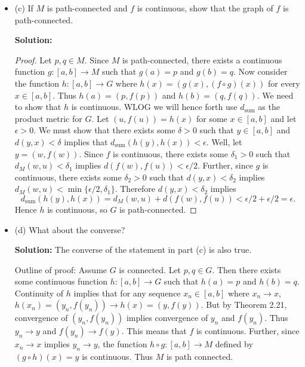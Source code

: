 \documentclass[11pt]{article}
\begin{document}
\begin{itemize}[label={},leftmargin=4mm, itemsep=1em, parsep=1em]
  \item (c) If $M$ is path-connected and $f$ is continuous, show that the graph
    of $f$ is path-connected.

  {\bf Solution:}
  \begin{proof}
    Let $p,q \in M$. Since $M$ is path-connected, there exists a continuous
    function $g : [a,b]\rightarrow M$ such that $g(a) = p$ and $g(b) = q$. Now
    consider the function $h : [a,b] \rightarrow G$ where $h(x) = (g(x),
    (f\circ g)(x))$ for every $x \in [a,b]$. Thus $h(a) = (p, f(p))$ and $h(b) =
    (q, f(q))$. We need to show that $h$ is continuous. WLOG we
    will hence forth use $d_{\text{sum}}$ as the product metric for $G$. Let
    $(u, f(u)) = h(x)$ for some $x \in [a,b]$ and let $\epsilon > 0$. We must
    show that there exists some $\delta > 0$ such that $y\in [a,b]$ and $d(y,x)
    < \delta$ implies that $d_{\text{sum}}(h(y), h(x)) < \epsilon$. Well, let $y
    = (w, f(w))$. Since $f$ is continuous, there exists some $\delta_{1} > 0$
    such that $d_{M}(w,u) < \delta_{1}$ implies $d(f(w), f(u)) < \epsilon / 2$.
    Further, since $g$ is continuous, there exists some $\delta_{2} > 0$ such that 
    $d(y,x) < \delta_{2}$ implies $d_{M}(w,u) < \min\{\epsilon / 2,
      \delta_{1}\}$. Therefore $d(y,x) < \delta_{2}$ implies 
    \[ d_{\text{sum}}(h(y), h(x)) = d_{M}(w,u) + d(f(w), f(u)) < \epsilon / 2 +
    \epsilon / 2 = \epsilon. \]
    Hence $h$ is continuous, so $G$ is path-connected.
  \end{proof}

  \item (d) What about the converse?

  {\bf Solution:} The converse of the statement in part (c) is also true.

  Outline of proof: Assume $G$ is connected. Let $p, q \in G$. Then there exists some continuous function
  $h: [a,b] \rightarrow G$ such that $h(a) = p$ and $h(b) = q$. Continuity of
  $h$ implies that for any sequence $x_{n} \in [a,b]$ where $x_{n}\rightarrow
  x$, $h(x_{n}) = (y_{n}, f(y_{n})) \rightarrow h(x) = (y, f(y))$. But by
  Theorem 2.21, convergence of $(y_{n}, f(y_{n}))$ implies convergence of
  $y_{n}$ and $f(y_{n})$. Thus $y_{n} \rightarrow y$ and $f(y_{n})\rightarrow
  f(y)$. This means that $f$ is continuous. Further, since $x_{n}\rightarrow
  x$ implies $y_{n}\rightarrow y$, the function $h\circ g : [a,b] \rightarrow
  M$ defined by $(g\circ h)(x) = y$ is continuous. Thus $M$ is path connected.
\end{itemize}
\end{document}
